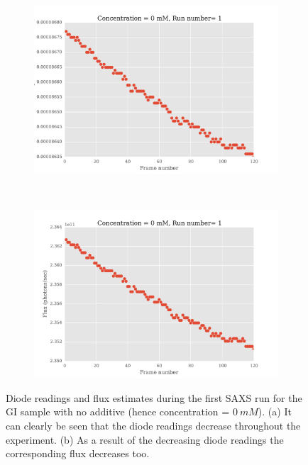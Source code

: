 \begin{figure}
    \centering
    \begin{subfigure}[b]{0.7\textwidth}
            \centering
            \includegraphics[width=\textwidth]{figures/saxs/np_diode_readings.pdf}
            \caption{}
            \label{fig:Diode readings}
    \end{subfigure}
    \\
    \begin{subfigure}[b]{0.7\textwidth}
            \centering
            \includegraphics[width=\textwidth]{figures/saxs/np_flux_estimates.pdf}
            \caption{}
            \label{fig:Flux estimates}
    \end{subfigure}
    \caption{Diode readings and flux estimates during the first SAXS run for the GI sample with no additive (hence concentration = $0\ mM$). (a) It can clearly be seen that the diode readings decrease throughout the experiment. (b) As a result of the decreasing diode readings the corresponding flux decreases too.}
    \label{fig:Diode and flux readings}
\end{figure}
